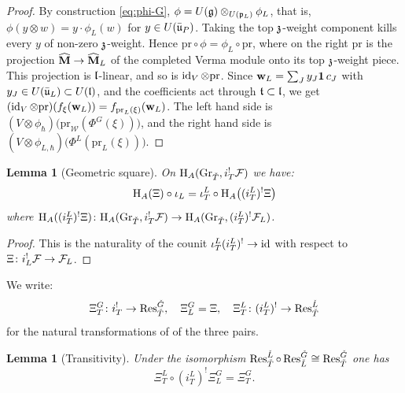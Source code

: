 \documentclass{article}
\theoremstyle{plain}
\newtheorem{lemma}[theorem]{Lemma}
\theoremstyle{definition}
\theoremstyle{remark}
\numberwithin{equation}{section}
\begin{document}
\begin{proof}
By construction \eqref{eq:phi-G}, $\phi=U(\mathfrak{g})\otimes_{U(\mathfrak{p}_L)}\phi_L$, that is, $\phi(y\otimes w)=y\cdot\phi_L(w)$ for $y\in U(\bar{\mathfrak{u}}_P)$. Taking the top $\mathfrak{z}$-weight component kills every $y$ of non-zero $\mathfrak{z}$-weight. Hence $\mathrm{pr}\circ\phi=\phi_L\circ\mathrm{pr}$, where on the right $\mathrm{pr}$ is the projection $\widehat{\mathbf{M}}\to\widehat{\mathbf{M}}_L$ of the completed Verma module onto its top $\mathfrak{z}$-weight piece. This projection is $\mathfrak{l}$-linear, and so is $\operatorname{id}_V\otimes\mathrm{pr}$. Since $\mathbf w_L=\sum_Jy_J\mathbf 1\,c_J$ with $y_J\in U(\bar{\mathfrak{u}}_L)\subset U(\mathfrak{l})$, and the coefficients act through $\mathfrak{t}\subset\mathfrak{l}$, we get $(\operatorname{id}_V\otimes\mathrm{pr})(f_\xi(\mathbf w_L))=f_{\mathrm{pr}_L(\xi)}(\mathbf w_L)$. The left hand side is $(V\otimes\phi_\hbar)\bigl(\mathrm{pr}_{\mathcal{W}}(\Phi^G(\xi))\bigr)$, and the right hand side is $(V\otimes\phi_{L,\hbar})\bigl(\Phi^L(\mathrm{pr}_L(\xi))\bigr)$.
\end{proof}

\begin{lemma}[Geometric square]\label{lem:geo-square}
On $\mathrm{H}_A(\operatorname{Gr}_{{\check{T}}},i_T^!\mathcal{F})$ we have:
\begin{equation*}
    \mathrm{H}_A(\Xi)\circ \iota_L=\iota^L_T\circ\mathrm{H}_A\bigl((i^L_T)^!\Xi\bigr)
\end{equation*}
where $\mathrm{H}_A((i^L_T)^!\Xi)\colon\mathrm{H}_A(\operatorname{Gr}_{{\check{T}}},i_T^!\mathcal{F})\to\mathrm{H}_A(\operatorname{Gr}_{{\check{T}}},(i^L_T)^!\mathcal{F}_L)$.
\end{lemma}

\begin{proof}
This is the naturality of the counit $\iota^L_T(i^L_T)^!\to\operatorname{id}$ with respect to $\Xi\colon i_L^!\mathcal{F}\to\mathcal{F}_L$.
\end{proof}

We write:
\begin{equation*}
    \Xi^G_T\colon i_T^!\to\operatorname{Res}^{{\check{G}}}_{{\check{T}}}, \quad \Xi^G_L=\Xi, \quad  \Xi^L_T\colon(i^L_T)^!\to\operatorname{Res}^{\check{L}}_{{\check{T}}}
\end{equation*}
for the natural transformations of \cite[(1.3.1)]{macerato2023leviequivariantrestrictionsphericalperverse} of the three pairs.

\begin{lemma}[Transitivity]\label{lem:Xi-trans}
Under the isomorphism $\operatorname{Res}^{\check{L}}_{{\check{T}}}\circ\operatorname{Res}^{{\check{G}}}_{\check{L}}\cong\operatorname{Res}^{{\check{G}}}_{{\check{T}}}$ one has
\begin{equation}\label{eq:Xi-trans}
\Xi^L_T\circ(i^L_T)^!\Xi^G_L=\Xi^G_T .
\end{equation}
\end{lemma}
\end{document}
